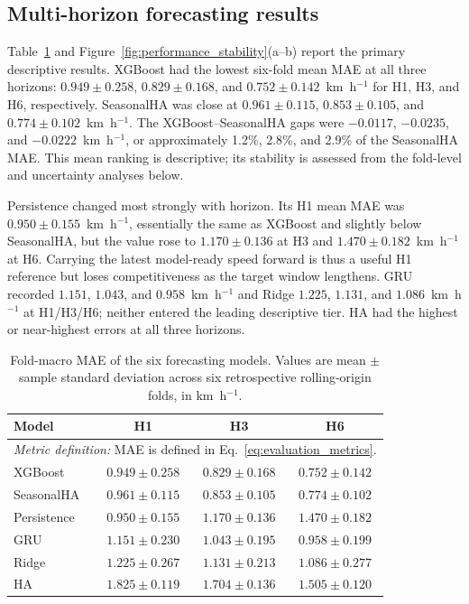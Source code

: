 \documentclass[pdflatex,sn-basic,Numbered]{sn-jnl}
\begin{document}
\subsection{Multi-horizon forecasting results}
\label{subsec:overall-results}

Table~\ref{tab:main_mae} and Figure~\ref{fig:performance_stability}(a--b) report the primary descriptive results. XGBoost had the lowest six-fold mean MAE at all three horizons: $0.949\pm0.258$, $0.829\pm0.168$, and $0.752\pm0.142$~km~h$^{-1}$ for H1, H3, and H6, respectively. SeasonalHA was close at $0.961\pm0.115$, $0.853\pm0.105$, and $0.774\pm0.102$~km~h$^{-1}$. The XGBoost--SeasonalHA gaps were $-0.0117$, $-0.0235$, and $-0.0222$~km~h$^{-1}$, or approximately 1.2\%, 2.8\%, and 2.9\% of the SeasonalHA MAE. This mean ranking is descriptive; its stability is assessed from the fold-level and uncertainty analyses below.

Persistence changed most strongly with horizon. Its H1 mean MAE was $0.950\pm0.155$~km~h$^{-1}$, essentially the same as XGBoost and slightly below SeasonalHA, but the value rose to $1.170\pm0.136$ at H3 and $1.470\pm0.182$~km~h$^{-1}$ at H6. Carrying the latest model-ready speed forward is thus a useful H1 reference but loses competitiveness as the target window lengthens. GRU recorded $1.151$, $1.043$, and $0.958$~km~h$^{-1}$ and Ridge $1.225$, $1.131$, and $1.086$~km~h$^{-1}$ at H1/H3/H6; neither entered the leading descriptive tier. HA had the highest or near-highest errors at all three horizons.

\begin{table}[!htbp]
\centering
\caption{Fold-macro MAE of the six forecasting models. Values are mean $\pm$ sample standard deviation across six retrospective rolling-origin folds, in km~h$^{-1}$.}
\label{tab:main_mae}
\small
\begin{tabular}{|l|c|c|c|}
\hline
\textbf{Model} & \textbf{H1} & \textbf{H3} & \textbf{H6} \\
\hline
\multicolumn{4}{|l|}{\textit{Metric definition:} MAE is defined in Eq.~\eqref{eq:evaluation_metrics}.} \\
\hline
XGBoost     & $0.949\pm0.258$ & $0.829\pm0.168$ & $0.752\pm0.142$ \\ 
\hline
SeasonalHA  & $0.961\pm0.115$ & $0.853\pm0.105$ & $0.774\pm0.102$ \\ 
\hline
Persistence & $0.950\pm0.155$ & $1.170\pm0.136$ & $1.470\pm0.182$ \\ 
\hline
GRU         & $1.151\pm0.230$ & $1.043\pm0.195$ & $0.958\pm0.199$ \\ 
\hline
Ridge       & $1.225\pm0.267$ & $1.131\pm0.213$ & $1.086\pm0.277$ \\ 
\hline
HA          & $1.825\pm0.119$ & $1.704\pm0.136$ & $1.505\pm0.120$ \\
\hline
\end{tabular}
\end{table}
\end{document}

